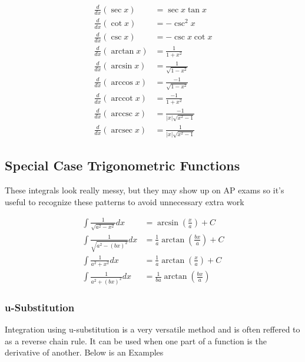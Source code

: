 \documentclass[12pt]{article}
\DeclareMathOperator{\arcsec}{arcsec}
\DeclareMathOperator{\arccot}{arccot}
\DeclareMathOperator{\arccsc}{arccsc}
\begin{document}
        \[
            \begin{aligned}
                \frac{d}{dx}(\sec x) &= \sec x \tan x \\
                \frac{d}{dx}(\cot x) &= -\csc^2 x \\
                \frac{d}{dx}(\csc x) &= -\csc x \cot x \\
                \frac{d}{dx}(\arctan x) &= \frac{1}{1 + x^2} \\
                \frac{d}{dx}(\arcsin x) &= \frac{1}{\sqrt{1 - x^2}} \\
                \frac{d}{dx}(\arccos x) &= \frac{-1}{\sqrt{1 - x^2}} \\
                \frac{d}{dx}(\arccot x) &= \frac{-1}{1 + x^2} \\
                \frac{d}{dx}(\arccsc x) &= \frac{-1}{\left|x\right|\sqrt{x^2 - 1}} \\
                \frac{d}{dx}(\arcsec x) &= \frac{1}{\left|x\right|\sqrt{x^2 - 1}}
            \end{aligned}    
        \]

        \subsection{Special Case Trigonometric Functions}

        These integrals look really messy, but they may show up on AP exams so it's useful
        to recognize these patterns to avoid unnecessary extra work

        \[
            \begin{aligned}
                \int\frac{1}{\sqrt{a^2 - x^2}}dx &= \arcsin\left(\frac{x}{a}\right) + C\\
                \int\frac{1}{\sqrt{a^2 - (bx)^2}}dx &= \frac{1}{a}\arctan\left(\frac{bx}{a}\right) + C\\
                \int\frac{1}{a^2 + x^2} dx &= \frac{1}{a}\arctan\left(\frac{x}{a}\right) + C\\
                \int\frac{1}{a^2 + (bx)^2} dx &= \frac{1}{ba}\arctan\left(\frac{bx}{a}\right)
            \end{aligned}    
        \]

        \subsubsection{u-Substitution}

        Integration using u-substitution is a very versatile method and is often
        reffered to as a reverse chain rule. It can be used when one part of a function
        is the derivative of another. Below is an Examples
        
\end{document}
